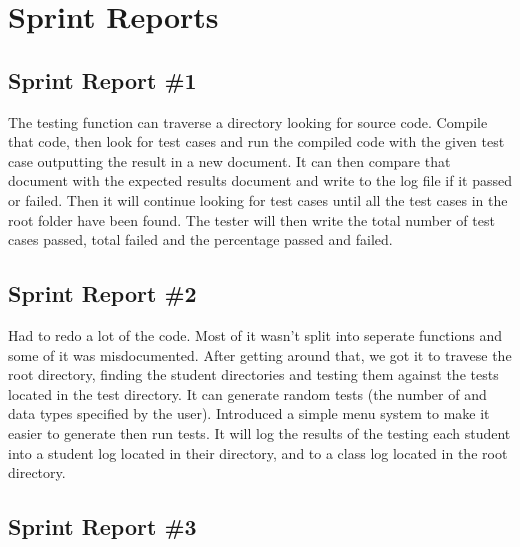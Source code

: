 
\chapter{Sprint Reports}

\section{Sprint Report \#1}
The testing function can traverse a directory looking for source code. Compile that code, then
look for test cases and run the compiled code with the given test case outputting the result in a 
new document. It can then compare that document with the expected results document and write
to the log file if it passed or failed. Then it will continue looking for test cases until all the test cases
in the root folder have been found. The tester will then write the total number of test cases passed,
total failed and the percentage passed and failed.

\section{Sprint Report \#2}

Had to redo a lot of the code. Most of it wasn't split into seperate functions and some of it was
misdocumented. After getting around that, we got it to travese the root directory, finding the
student directories and testing them against the tests located in the test directory. It can generate random
tests (the number of and data types specified by the user). Introduced a simple menu system to make it easier
to generate then run tests. It will log the results of the testing each student into a student log located in their
directory, and to a class log located in the root directory.

\section{Sprint Report \#3}
